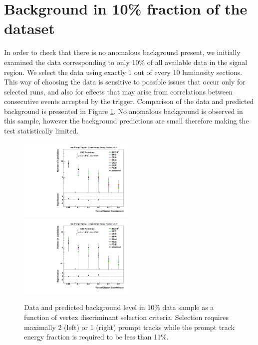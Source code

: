 \section{Background in 10\% fraction of the dataset}
\label{sec:partunblinding}

In order to check that there is no anomalous background present,
 we initially examined the data corresponding to only 10\% of all available 
data in the signal region.  
We select the data using exactly 1 out of every 10 luminosity sections. This way of choosing 
the data is sensitive to possible issues that occur only for selected runs, and also for effects that may arise from
correlations between consecutive events accepted by the trigger. Comparison of the data and predicted
background is presented in Figure \ref{fig:10percent}. No anomalous background is observed in this sample,
however the background predictions are small therefore making the test statistically limited.

\begin{figure}[htbp]
  \centering
  \includegraphics[width=0.495\textwidth]{plots/background/tenpercent1.pdf}
  \includegraphics[width=0.495\textwidth]{plots/background/tenpercent2.pdf}
  \caption{Data and predicted background level in 10\% data sample as a function of vertex discriminant
selection criteria. Selection requires maximally 2 (left) or 1 (right) prompt tracks while the prompt track energy 
fraction is required to be less than 11\%. \label{fig:10percent}}
\end{figure}  


